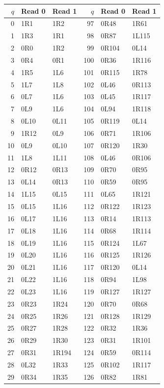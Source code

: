 {\small\ttfamily
\begin{longtable}{rll@{\hspace{0.7in}}rll}
\toprule $q$ & Read 0 & Read 1 & $q$ & Read 0 & Read 1\\\midrule\endhead
0 & 1R1 & 1R2 & 97 & 0R48 & 1R61\\
1 & 1R3 & 1R1 & 98 & 0R87 & 1L115\\
2 & 0R0 & 1R2 & 99 & 0R104 & 0L14\\
3 & 0R4 & 0R1 & 100 & 0R36 & 1R116\\
4 & 1R5 & 1L6 & 101 & 0R115 & 1R78\\
5 & 1L7 & 1L8 & 102 & 0L46 & 0R113\\
6 & 0L7 & 1L6 & 103 & 0L45 & 1R117\\
7 & 0L9 & 1L6 & 104 & 0L94 & 1R118\\
8 & 0L10 & 0L11 & 105 & 0R119 & 0L14\\
9 & 1R12 & 0L9 & 106 & 0R71 & 1R106\\
10 & 0L9 & 0L10 & 107 & 0R120 & 1R30\\
11 & 1L8 & 1L11 & 108 & 0L46 & 0R106\\
12 & 0R12 & 0R13 & 109 & 0R70 & 0R95\\
13 & 0L14 & 0R13 & 110 & 0R59 & 0R95\\
14 & 1L15 & 0L15 & 111 & 0L65 & 1R121\\
15 & 0L15 & 1L16 & 112 & 0R122 & 1R123\\
16 & 0L17 & 1L16 & 113 & 0R14 & 1R113\\
17 & 0L18 & 1L16 & 114 & 0R68 & 1R114\\
18 & 0L19 & 1L16 & 115 & 0R124 & 1L67\\
19 & 0L20 & 1L16 & 116 & 0R125 & 1R126\\
20 & 0L21 & 1L16 & 117 & 0R120 & 0L14\\
21 & 0L22 & 1L16 & 118 & 0R94 & 1L98\\
22 & 0L23 & 1L16 & 119 & 0R127 & 1R127\\
23 & 0R23 & 1R24 & 120 & 0R70 & 0R68\\
24 & 0R25 & 1R26 & 121 & 0R128 & 1R129\\
25 & 0R27 & 1R28 & 122 & 0R32 & 1R36\\
26 & 0R29 & 1R30 & 123 & 0R31 & 1R101\\
27 & 0R31 & 1R194 & 124 & 0R59 & 0R114\\
28 & 0L32 & 1R33 & 125 & 0R102 & 1R117\\
29 & 0R34 & 1R35 & 126 & 0R82 & 1R81\\

\end{longtable}}
